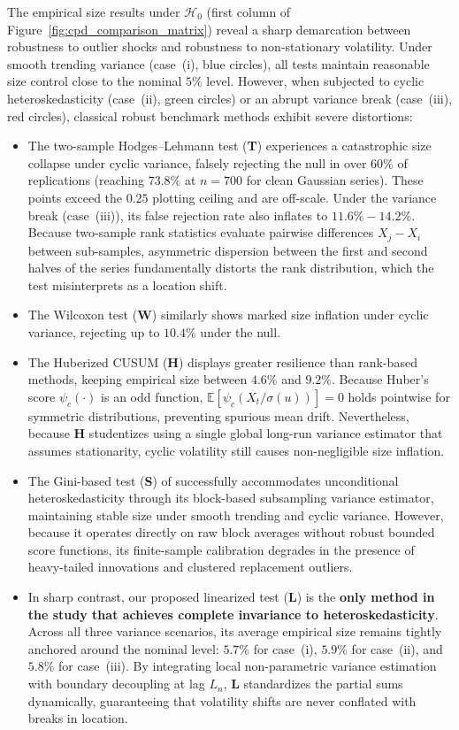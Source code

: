 \documentclass[10pt, a4paper]{article}
\theoremstyle{assumption}
\theoremstyle{definition}
\theoremstyle{theorem}
\begin{document}
The empirical size results under $\mathcal{H}_0$ (first column of Figure~\ref{fig:cpd_comparison_matrix}) reveal a sharp demarcation between robustness to outlier shocks and robustness to non-stationary volatility. Under smooth trending variance (case~(i), blue circles), all tests maintain reasonable size control close to the nominal $5\%$ level. However, when subjected to cyclic heteroskedasticity (case~(ii), green circles) or an abrupt variance break (case~(iii), red circles), classical robust benchmark methods exhibit severe distortions:
\begin{itemize}
    \item The two-sample Hodges--Lehmann test (\textbf{T}) experiences a catastrophic size collapse under cyclic variance, falsely rejecting the null in over $60\%$ of replications (reaching $73.8\%$ at $n=700$ for clean Gaussian series). These points exceed the $0.25$ plotting ceiling and are off-scale. Under the variance break (case~(iii)), its false rejection rate also inflates to $11.6\% - 14.2\%$. Because two-sample rank statistics evaluate pairwise differences $X_j - X_i$ between sub-samples, asymmetric dispersion between the first and second halves of the series fundamentally distorts the rank distribution, which the test misinterprets as a location shift.
    \item The Wilcoxon test (\textbf{W}) similarly shows marked size inflation under cyclic variance, rejecting up to $10.4\%$ under the null.
    \item The Huberized CUSUM (\textbf{H}) displays greater resilience than rank-based methods, keeping empirical size between $4.6\%$ and $9.2\%$. Because Huber's score $\psi_c(\cdot)$ is an odd function, $\mathbb{E}[\psi_c(X_t/\sigma(u))] = 0$ holds pointwise for symmetric distributions, preventing spurious mean drift. Nevertheless, because \textbf{H} studentizes using a single global long-run variance estimator that assumes stationarity, cyclic volatility still causes non-negligible size inflation.
    \item The Gini-based test (\textbf{S}) of \citet{schmidt2021} successfully accommodates unconditional heteroskedasticity through its block-based subsampling variance estimator, maintaining stable size under smooth trending and cyclic variance. However, because it operates directly on raw block averages without robust bounded score functions, its finite-sample calibration degrades in the presence of heavy-tailed innovations and clustered replacement outliers.
    \item In sharp contrast, our proposed linearized test (\textbf{L}) is the \textbf{only method in the study that achieves complete invariance to heteroskedasticity}. Across all three variance scenarios, its average empirical size remains tightly anchored around the nominal level: $5.7\%$ for case~(i), $5.9\%$ for case~(ii), and $5.8\%$ for case~(iii). By integrating local non-parametric variance estimation with boundary decoupling at lag $L_n$, \textbf{L} standardizes the partial sums dynamically, guaranteeing that volatility shifts are never conflated with breaks in location.
\end{itemize}
\end{document}
